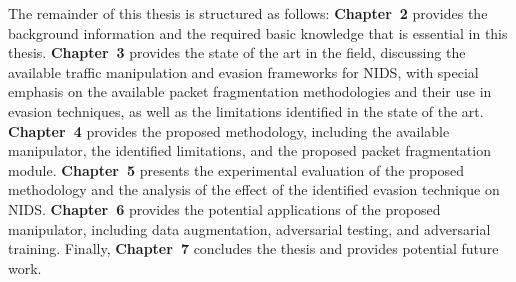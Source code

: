 The remainder of this thesis is structured as follows:  
\textbf{Chapter~2} provides the background information and the required basic knowledge that is essential in this thesis.  
\textbf{Chapter~3} provides the state of the art in the field, discussing the available traffic manipulation and evasion frameworks for NIDS, with special emphasis on the available packet fragmentation methodologies and their use in evasion techniques, as well as the limitations identified in the state of the art.  
\textbf{Chapter~4} provides the proposed methodology, including the available manipulator, the identified limitations, and the proposed packet fragmentation module.  
\textbf{Chapter~5} presents the experimental evaluation of the proposed methodology and the analysis of the effect of the identified evasion technique on NIDS.  
\textbf{Chapter~6} provides the potential applications of the proposed manipulator, including data augmentation, adversarial testing, and adversarial training.  
Finally, \textbf{Chapter~7} concludes the thesis and provides potential future work.